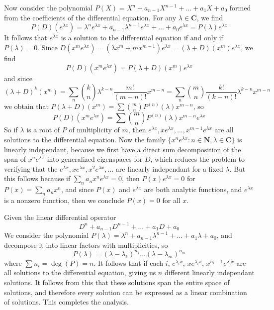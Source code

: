 Now consider the polynomial $P(X) = X^n + a_{n-1}X^{n-1} + \dots + a_1X + a_0$ formed from the coefficients of the differential equation. For any $\lambda \in \mathbf{C}$, we find
%
\[ P(D)(e^{\lambda x}) = \lambda^n e^{\lambda x} + a_{n-1} \lambda^{n-1} e^{\lambda x} + \dots + a_0 e^{\lambda x} = P(\lambda) e^{\lambda x} \]
%
It follows that $e^{\lambda x}$ is a solution to the differential equation if and only if $P(\lambda) = 0$. Since $D(x^m e^{\lambda x}) = (\lambda x^m + mx^{m-1})e^{\lambda x} = (\lambda + D)(x^m) e^{\lambda x}$, we find
%
\[ P(D)(x^m e^{\lambda x}) = P(\lambda + D)(x^m) e^{\lambda x} \]
%
and since
%
\[ (\lambda + D)^k(x^m) = \sum_n {k \choose n} \lambda^{k-n} \frac{m!}{(m-n)!} x^{m-n} = \sum_n {m \choose n} \frac{k!}{(k-n)!} \lambda^{k-n} x^{m-n} \]
%
we obtain that $P(\lambda + D)(x^m) = \sum {m \choose n} P^{(n)}(\lambda) x^{m-n}$, so
%
\[ P(D)(x^m e^{\lambda x}) = \sum {m \choose n} P^{(n)}(\lambda) x^{m-n} e^{\lambda x} \]
%
So if $\lambda$ is a root of $P$ of multiplicity of $m$, then $e^{\lambda x}, xe^{\lambda x}, \dots, x^{m-1}e^{\lambda x}$ are all solutions to the differential equation. Now the family $\{ x^ne^{\lambda x} : n \in \mathbf{N}, \lambda \in \mathbf{C} \}$ is linearly independant, because we first have a direct sum decomposition of the span of $x^ne^{\lambda x}$ into generalized eigenspaces for $D$, which reduces the problem to verifying that the $e^{\lambda x}, xe^{\lambda x}, x^2e^{\lambda x}, \dots$ are linearly independant for a fixed $\lambda$. But this follows because if $\sum_n a_nx^ne^{\lambda x} = 0$, then $P(x)e^{\lambda x} = 0$ for $P(x) = \sum_n a_nx^n$, and since $P(x)$ and $e^{\lambda x}$ are both analytic functions, and $e^{\lambda x}$ is a nonzero function, then we conclude $P(x) = 0$ for all $x$.

Given the linear differential operator
%
\[ D^n + a_{n-1}D^{n-1} + \dots + a_1D + a_0 \]
%
We consider the polynomial $P(\lambda) = \lambda^n + a_{n-1}\lambda^{n-1} + \dots + a_1\lambda + a_0$, and decompose it into linear factors with multiplicities, so
%
\[ P(\lambda) = (\lambda - \lambda_1)^{n_1} \dots (\lambda - \lambda_m)^{n_m} \]
%
where $\sum n_i = \deg(P) = n$. It follows that if each $i$, $e^{\lambda_i x}$, $xe^{\lambda_i x}$, $x^{n_i - 1}e^{\lambda_i x}$ are all solutions to the differential equation, giving us $n$ different linearly independant solutions. It follows from this that these solutions span the entire space of solutions, and therefore every solution can be expressed as a linear combination of solutions. This completes the analysis.

